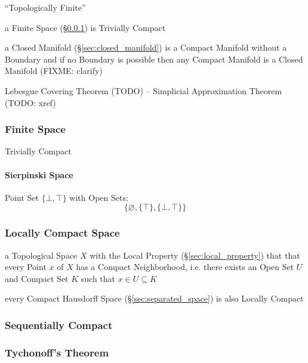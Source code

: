 ``Topologically Finite''

a Finite Space (\S\ref{sec:finite_space}) is Trivially Compact

\fist a Closed Manifold (\S\ref{sec:closed_manifold}) is a Compact Manifold
without a Boundary and if no Boundary is possible then any Compact Manifold
is a Closed Manifold (FIXME: clarify)

Lebesgue Covering Theorem (TODO) -- Simplicial Approximation Theorem (TODO:
xref)



\subsubsection{Finite Space}\label{sec:finite_space}

Trivially Compact



\paragraph{Sierpinski Space}\label{sec:sierpinski_space}\hfill

Point Set $\{ \bot, \top \}$ with Open Sets:
\[
  \{ \varnothing, \{\top\}, \{\bot, \top\} \}
\]



\subsubsection{Locally Compact Space}\label{sec:locally_compact}

a Topological Space $X$ with the Local Property (\S\ref{sec:local_property})
that that every Point $x$ of $X$ has a Compact Neighborhood, i.e. there exists
an Open Set $U$ and Compact Set $K$ such that $x \in U \subseteq K$

every Compact Hausdorff Space (\S\ref{sec:separated_space}) is also Locally
Compact



\subsubsection{Sequentially Compact}\label{sec:sequentially_compact}

\subsubsection{Tychonoff's Theorem}\label{sec:tychonoffs_theorem}

